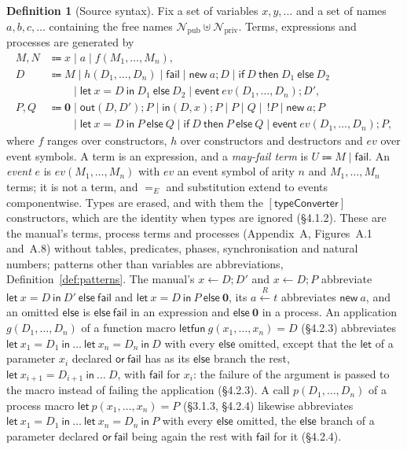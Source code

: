 \documentclass[11pt]{article}
\theoremstyle{definition}
\newtheorem{definition}{Definition}[section]
\theoremstyle{plain}
\theoremstyle{remark}
\begin{document}
\begin{definition}[Source syntax]\label{def:syntax}
Fix a set of variables $x,y,\dots$ and a set of names $a,b,c,\dots$ containing the free names $\mathcal{N}_{\mathrm{pub}}\uplus\mathcal{N}_{\mathrm{priv}}$. Terms, expressions and processes are generated by
\begin{align*}
M,N &\Coloneqq x\mid a\mid f(M_1,\dots,M_n),\\
D &\Coloneqq M\mid h(D_1,\dots,D_n)\mid\mathsf{fail}\mid\mathsf{new}\ a;D\mid\mathsf{if}\ D\ \mathsf{then}\ D_1\ \mathsf{else}\ D_2\\
&\qquad\mid\mathsf{let}\ x=D\ \mathsf{in}\ D_1\ \mathsf{else}\ D_2\mid\mathsf{event}\ ev(D_1,\dots,D_n);D',\\
P,Q &\Coloneqq \mathbf{0}\mid \mathsf{out}(D,D');P\mid \mathsf{in}(D,x);P\mid P\mid Q\mid\,!P\mid\mathsf{new}\ a;P\\
&\qquad\mid \mathsf{let}\ x=D\ \mathsf{in}\ P\ \mathsf{else}\ Q\mid \mathsf{if}\ D\ \mathsf{then}\ P\ \mathsf{else}\ Q\mid \mathsf{event}\ ev(D_1,\dots,D_n);P,
\end{align*}
where $f$ ranges over constructors, $h$ over constructors and destructors and $ev$ over event symbols. A term is an expression, and a \emph{may-fail term} is $U\Coloneqq M\mid\mathsf{fail}$. An \emph{event} $e$ is $ev(M_1,\dots,M_n)$ with $ev$ an event symbol of arity $n$ and $M_1,\dots,M_n$ terms; it is not a term, and $=_E$ and substitution extend to events componentwise. Types are erased, and with them the $[\mathsf{typeConverter}]$ constructors, which are the identity when types are ignored (\S4.1.2). These are the manual's terms, process terms and processes (Appendix~A, Figures~A.1 and~A.8) without tables, predicates, phases, synchronisation and natural numbers; patterns other than variables are abbreviations, Definition~\ref{def:patterns}. The manual's $x\leftarrow D;D'$ and $x\leftarrow D;P$ abbreviate $\mathsf{let}\ x=D\ \mathsf{in}\ D'\ \mathsf{else}\ \mathsf{fail}$ and $\mathsf{let}\ x=D\ \mathsf{in}\ P\ \mathsf{else}\ \mathbf{0}$, its $a\xleftarrow{R}t$ abbreviates $\mathsf{new}\ a$, and an omitted $\mathsf{else}$ is $\mathsf{else}\ \mathsf{fail}$ in an expression and $\mathsf{else}\ \mathbf{0}$ in a process. An application $g(D_1,\dots,D_n)$ of a function macro $\mathsf{letfun}\ g(x_1,\dots,x_n)=D$ (\S4.2.3) abbreviates $\mathsf{let}\ x_1=D_1\ \mathsf{in}\ \dots\ \mathsf{let}\ x_n=D_n\ \mathsf{in}\ D$ with every $\mathsf{else}$ omitted, except that the $\mathsf{let}$ of a parameter $x_i$ declared $\mathsf{or\ fail}$ has as its $\mathsf{else}$ branch the rest, $\mathsf{let}\ x_{i+1}=D_{i+1}\ \mathsf{in}\ \dots\ D$, with $\mathsf{fail}$ for $x_i$: the failure of the argument is passed to the macro instead of failing the application (\S4.2.3). A call $p(D_1,\dots,D_n)$ of a process macro $\mathsf{let}\ p(x_1,\dots,x_n)=P$ (\S3.1.3, \S4.2.4) likewise abbreviates $\mathsf{let}\ x_1=D_1\ \mathsf{in}\ \dots\ \mathsf{let}\ x_n=D_n\ \mathsf{in}\ P$ with every $\mathsf{else}$ omitted, the $\mathsf{else}$ branch of a parameter declared $\mathsf{or\ fail}$ being again the rest with $\mathsf{fail}$ for it (\S4.2.4).
\end{definition}
\end{document}
